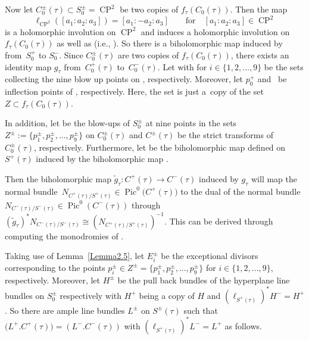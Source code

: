\documentclass[pdftex]{sigma}
\numberwithin{equation}{section}
\begin{document}
Now let $C^{\pm}_0(\tau) \subset S^{\pm}_0=\operatorname{CP}^2 $ be two copies of $f_{\tau}(C_0(\tau))$. Then the map
\[\ell_{\operatorname{CP}^2}([a_1:a_2:a_3])=[a_1:-a_2:a_3] \qquad \text{for} \quad [a_1:a_2:a_3]\in \operatorname{CP}^2\]
is a holomorphic involution on $\operatorname{CP}^2$ and induces a holomorphic involution on $f_{\tau}(C_0(\tau))$ as well as  (i.e., ). So there is a biholomorphic map  induced by  from~$S^{+}_0$ to $S^{-}_0$. Since $C^\pm_0(\tau)$ are two copies of $f_{\tau}(C_0(\tau))$, there exists an identity map $g_\tau$ from~$C_0^{+}(\tau)$ to~$C_0^{-}(\tau)$. Let  with  for $i \in \{1, 2, \dots , 9 \}$ be the sets collecting the nine blow up points on , respectively. Moreover, let $p^{+}_0$ and~ be inflection points of , respectively. Here, the set  is just a~copy of the set~$Z \subset f_{\tau}(C_0(\tau))$.

In addition, let  be the blow-ups of $S^{\pm}_0$ at nine points in the sets $Z^{\pm}:=\bigl\{p^{\pm}_1, p^{\pm}_2, \dots , p^{\pm}_9\bigr\}$ on $C_0^{\pm}(\tau)$ and $C^{\pm}(\tau)$ be the strict transforms of $C_0^{\pm}(\tau)$, respectively. Furthermore, let  be the biholomorphic map defined on $S^{+}(\tau)$ induced by the biholomorphic map .

Then the biholomorphic map $\widetilde{g}_{\tau}\colon C^{+}(\tau)\rightarrow C^{-}(\tau)$ induced by $g_{\tau}$ will map the normal bundle~${N_{C^+(\tau)/S^+(\tau)}\in \operatorname{Pic}^{0}\bigl(C^{+}(\tau)\bigr)}$ to the dual of the normal bundle $N_{C^-(\tau)/S^-(\tau)}\in \operatorname{Pic}^{0}(C^{-}(\tau))$ through $(\widetilde{g}_{\tau})^*N_{C^-(\tau)/S^-(\tau)}\cong (N_{C^+(\tau)/S^+(\tau)})^{-1}$. This can be derived through computing the monodromies of .

Taking use of Lemma~\ref{Lemma2.5}, let $E^{\pm}_i$ be the exceptional divisors corresponding to the points $p^{\pm}_i \in Z^{\pm}=\bigl\{p^{\pm}_1, p^{\pm}_2, \dots , p^{\pm}_9\bigr\}$ for $i \in \{1, 2, \dots , 9 \}$, respectively. Moreover, let $H^{\pm}$ be the pull back bundles of the hyperplane line bundles on $S_0^{\pm}$ respectively with $H^+$ being a copy of $H$ and $(\ell_{S^{+}(\tau)})^*H^-=H^+$. So there are ample line bundles $L^{\pm}$ on $S^{\pm}(\tau)$ such that $\bigl(L^{+}.C^{+}(\tau)\bigr)=(L^{-}.C^{-}(\tau))$ with $(\ell_{S^{+}(\tau)})^*L^{-}=L^{+}$ as follows.
\end{document}
